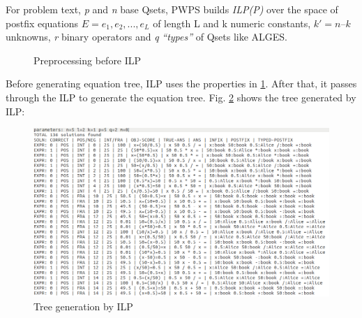 \documentclass[document.tex]{subfiles}
\begin{document}
For problem text, \textit{p} and \textit{n} base Qsets, PWPS builds \textit{ILP(P)} over the space of postfix equations $ E = e_1, e_2,...,e_L $ of length L  and k numeric constants, $k'  = n – k$ unknowns, \textit{r} binary operators and \textit{q} \textit{“types”} of Qsets like ALGES.

\begin{figure}[H]
	\begin{center}
	\end{center}
	\caption{Preprocessing before ILP}
	\label{fig:i_Pre_ILP}
\end{figure}
Before generating equation tree, ILP uses the properties in \ref{fig:i_Pre_ILP}. After that, it passes through the ILP to generate the equation tree. Fig. \ref{fig:i_ILP} shows the tree generated by ILP:
\begin{landscape}
\begin{figure}
	\includegraphics[scale=0.68]{imgs/ILP_tree.png}
	\caption{Tree generation by ILP}
	\label{fig:i_ILP}
\end{figure}
\end{landscape}
\end{document}
